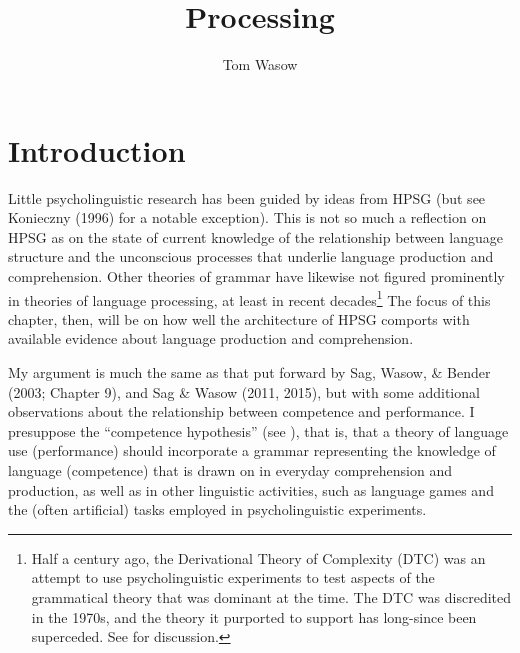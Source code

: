\documentclass[a4paper]{article}
\title{Processing}
\author{Tom Wasow}
\begin{document}
\maketitle


\section{Introduction}

Little psycholinguistic research has been guided by ideas from HPSG (but see  Konieczny (1996) for a notable exception).  This is not so much a reflection on HPSG as on the state of current knowledge of the relationship between language structure and the unconscious processes that underlie language production and comprehension.  Other theories of grammar have likewise not figured prominently in theories of language processing, at least in recent decades\footnote{Half a century ago, the Derivational Theory of Complexity (DTC) was an attempt to use psycholinguistic experiments to test aspects of the grammatical theory that was dominant at the time.  The DTC was discredited in the 1970s, and the theory it purported to support has long-since been superceded.  See \citet{FBG74a-u} for discussion.}  The focus of this chapter, then, will be on how well the architecture of HPSG comports with available evidence about language production and comprehension.  

My argument is much the same as that put forward by Sag, Wasow, \& Bender (2003; Chapter 9), and Sag \& Wasow (2011, 2015), but with some additional observations about the relationship between competence and performance. I presuppose the ``competence hypothesis'' (see \citealt[Chapter~1]{Chomsky65a}), that is, that a theory of language use (performance) should incorporate a grammar representing the knowledge of language (competence) that is drawn on in everyday comprehension and production, as well as in other linguistic activities, such as language games and the (often artificial) tasks employed in psycholinguistic experiments.  
\end{document}
